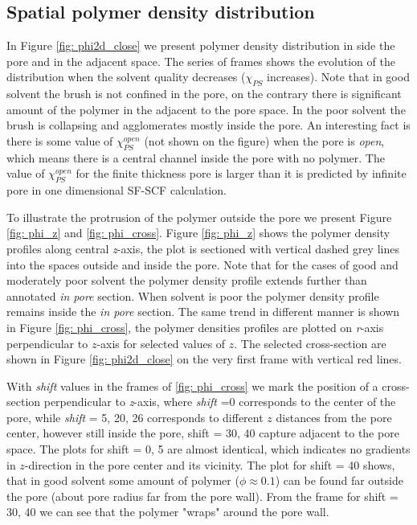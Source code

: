 \documentclass[12pt,a4paper]{article}
\begin{document}
\subsection{Spatial polymer density distribution}

In Figure \ref{fig: phi2d_close} we present polymer density distribution in side the pore and in the adjacent space. The series of frames shows the evolution of the distribution when the solvent quality decreases ($\chi_{PS}$ increases). 
Note that in good solvent the brush is not confined in the pore, on the contrary there is significant amount of the polymer in the adjacent to the pore space.
In the poor solvent the brush is collapsing and agglomerates mostly inside the pore.
An interesting fact is there is some value of $\chi_{PS}^{open}$ (not shown on the figure)
when the pore is \emph{open}, which means there is a central channel inside the pore with no polymer.
The value of $\chi_{PS}^{open}$ for the finite thickness pore is larger than it is predicted by infinite pore in one dimensional SF-SCF calculation. %

To illustrate the protrusion of the polymer outside the pore we present Figure \ref{fig: phi_z} and \ref{fig: phi_cross}. 
Figure \ref{fig: phi_z} shows the polymer density profiles along central \emph{z}-axis, the plot is sectioned with vertical dashed grey lines into the spaces outside and inside the pore. 
Note that for the cases of good and moderately poor solvent the polymer density profile extends further than annotated \emph{in pore} section. When solvent is poor the polymer density profile remains inside the \emph{in pore} section.
The same trend in different manner is shown in Figure \ref{fig: phi_cross}, the polymer densities profiles are plotted on \emph{r}-axis perpendicular to $z$-axis for selected values of $z$. 
The selected cross-section are shown in Figure \ref{fig: phi2d_close} on the very first frame with vertical red lines.

With \emph{shift} values in the frames of \ref{fig: phi_cross} we mark the position of a cross-section perpendicular to \emph{z}-axis, where \emph{shift} =0 corresponds to the center of the pore, while \emph{shift} = 5, 20, 26 corresponds to different $z$ distances from the pore center, however still inside the pore, {shift} = 30, 40 capture adjacent to the pore space.
The plots for {shift} = 0, 5 are almost identical, which indicates no gradients in $z$-direction in the pore center and its vicinity.
The plot for {shift} = 40 shows, that in good solvent some amount of polymer ($\phi \approx 0.1$) can be found far outside the pore (about pore radius far from the pore wall).
From the frame for {shift} = 30, 40 we can see that the polymer "wraps" around the pore wall.
\end{document}
